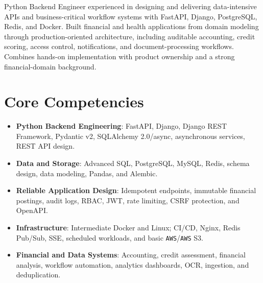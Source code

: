 \documentclass[11pt,a4paper,sans]{moderncv}
\begin{document}
\makecvtitle

\vspace{4pt}
\small{Python Backend Engineer experienced in designing and delivering data-intensive APIs and business-critical workflow systems with FastAPI, Django, PostgreSQL, Redis, and Docker. Built financial and health applications from domain modeling through production-oriented architecture, including auditable accounting, credit scoring, access control, notifications, and document-processing workflows. Combines hands-on implementation with product ownership and a strong financial-domain background.}

\section{Core Competencies}
\vspace{1pt}
\begin{itemize}
\item \textbf{Python Backend Engineering}: FastAPI, Django, Django REST Framework, Pydantic v2, SQLAlchemy 2.0/async, asynchronous services, REST API design.
\item \textbf{Data and Storage}: Advanced SQL, PostgreSQL, MySQL, Redis, schema design, data modeling, Pandas, and Alembic.
\item \textbf{Reliable Application Design}: Idempotent endpoints, immutable financial postings, audit logs, RBAC, JWT, rate limiting, CSRF protection, and OpenAPI.
\item \textbf{Infrastructure}: Intermediate Docker and Linux; CI/CD, Nginx, Redis Pub/Sub, SSE, scheduled workloads, and basic \texttt{AWS}/\texttt{AWS} S3.
\item \textbf{Financial and Data Systems}: Accounting, credit assessment, financial analysis, workflow automation, analytics dashboards, OCR, ingestion, and deduplication.
\end{itemize}
\end{document}
